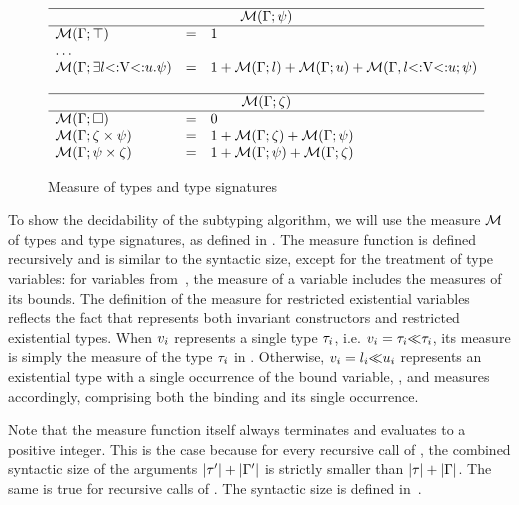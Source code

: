 \begin{figure}
\[\begin{array}{lcl}
    \\
    \hline
    \multicolumn{3}{c}{\tymsrdflt{\tysig}} \\ 
    \hline 
    \tymsrdflt{\tyany} &=& 1\\
    \multicolumn{3}{l}{\ldots} \\
    \tymsrdflt{\tyexist{\vany}{\tylb}{\tyub}{\tysig}} &=& 
        1 + \tymsrdflt{\tylb} + \tymsrdflt{\tyub} + 
        \tymsr{\AEnv,\varbound{\vany}{\tylb}{\tyub}}{\tysig}\\
    \\
    \hline
    \multicolumn{3}{c}{\tymsrdflt{\dctxsig}} \\ 
    \hline 
    \tymsrdflt{\square} &=& 0\\
    \tymsrdflt{\typair{\dctxsig}{\tysig}} &=& 
        1 + \tymsrdflt{\dctxsig} + \tymsrdflt{\tysig}\\
    \tymsrdflt{\typair{\tysig}{\dctxsig}} &=& 
        1 + \tymsrdflt{\tysig} + \tymsrdflt{\dctxsig}\\
\end{array}
\]
\caption{Measure of types and type signatures}\label{fig:ty-measure}
\end{figure}

To show the decidability of the subtyping algorithm,
we will use the measure $\operatorname{\mathcal{M}}$ of types and type signatures,
as defined in .
The measure function is defined recursively and is
similar to the syntactic size,
except for the treatment of type variables: for variables from~\AEnv,
the measure of a variable includes the measures of its bounds.
The definition of the measure for restricted existential variables \rexvar
reflects the fact that \tyinv{} represents both
invariant constructors and restricted existential types.
When $v_i$ represents a single type $\tau_i$,
i.e. $v_i = \tau_i{\operatorname{\ll}}\tau_i$,
its measure is simply the measure of the type $\tau_i$ in
\tyinv{}.
Otherwise, $v_i = l_i{\operatorname{\ll}}u_i$ represents
an existential type with a single occurrence of the bound variable,
,
and measures accordingly, comprising both the binding and its single occurrence.

Note that the measure function itself always terminates and evaluates to a
positive integer. This is the case because for every recursive call
 of \tymsrdflt{\ty}, 
the combined syntactic size of the arguments $|\tau'| + |\Gamma'|$
is strictly smaller than $|\tau| + |\Gamma|$.
The same is true for recursive calls
 of \tymsrdflt{\tysig}.
The syntactic size is defined in~.

